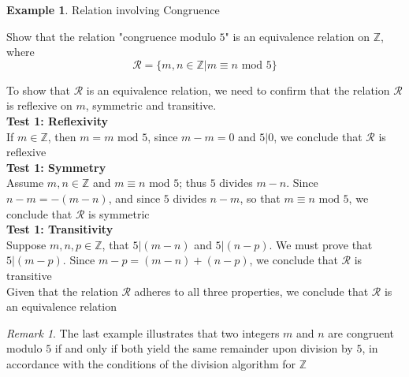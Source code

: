 \documentclass{book}
\theoremstyle{definition}
\newtheorem{example}{Example}[definition]
\theoremstyle{remark}
\newtheorem{remark}{Remark}
\newcommand{\bb}[1]{\mathbb{#1}}
\newcommand{\cc}[1]{\mathcal{#1}}
\begin{document}
    \newpage
    \begin{example}
        Relation involving Congruence \\
        
        \begin{tcolorbox}
            Show that the relation "congruence modulo $5$" is an equivalence relation on $\bb{Z}$, where
                \begin{equation*}
                    \cc{R} = \{ m,n \in \bb{Z} | m \equiv n \text{ mod } 5 \}
                \end{equation*}
            
        \end{tcolorbox}
    
    To show that $\cc{R}$ is an equivalence relation, we need to confirm that the relation $\cc{R}$ is reflexive on $m$, symmetric and transitive. \\
            
            \textbf{Test 1: Reflexivity } \\    
                If $m \in \bb{Z}$, then $m=m \text{ mod } 5$, since $m-m = 0$ and $5 | 0$, we conclude that $\cc{R}$ is reflexive \\
    
            \textbf{Test 1: Symmetry } \\
                Assume $m,n \in \bb{Z}$ and $m \equiv n \text{ mod } 5$; thus $5$ divides $m-n$. Since $n-m = -(m-n)$, and since $5$ divides $n-m$, so that $m \equiv n \text{ mod } 5$, we conclude that $\cc{R}$ is symmetric \\
            
            \textbf{Test 1: Transitivity } \\    
                Suppose $m, n, p \in \bb{Z}$, that $5 | (m-n)$ and $5 | (n-p)$. We must prove that $5 | (m-p)$. Since $m-p = (m-n) + (n-p)$, we conclude that $\cc{R}$ is transitive \\
        
        Given that the relation $\cc{R}$ adheres to all three properties, we conclude that $\cc{R}$ is an equivalence relation
    
    \end{example}

    \begin{remark}
        The last example illustrates that two integers $m$ and $n$ are congruent modulo $5$ if and only if both yield the same remainder upon division by $5$, in accordance with the conditions of the division algorithm for $\bb{Z}$
    \end{remark}
\end{document}

